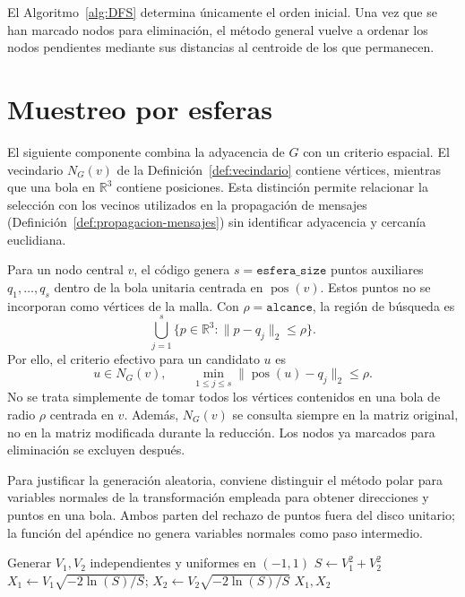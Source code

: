 El Algoritmo~\ref{alg:DFS} determina únicamente el orden inicial. Una vez que se han marcado nodos para eliminación, el método general vuelve a ordenar los nodos pendientes mediante sus distancias al centroide de los que permanecen.

\section{Muestreo por esferas}

El siguiente componente combina la adyacencia de $G$ con un criterio espacial. El vecindario $N_G(v)$ de la Definición~\ref{def:vecindario} contiene vértices, mientras que una bola en $\mathbb{R}^3$ contiene posiciones. Esta distinción permite relacionar la selección con los vecinos utilizados en la propagación de mensajes (Definición~\ref{def:propagacion-mensajes}) sin identificar adyacencia y cercanía euclidiana.

Para un nodo central $v$, el código genera $s=\texttt{esfera\_size}$ puntos auxiliares $q_1,\ldots,q_s$ dentro de la bola unitaria centrada en $\operatorname{pos}(v)$. Estos puntos no se incorporan como vértices de la malla. Con $\rho=\texttt{alcance}$, la región de búsqueda es
\[
\bigcup_{j=1}^{s}\{p\in\mathbb{R}^3:\|p-q_j\|_2\leq\rho\}.
\]
Por ello, el criterio efectivo para un candidato $u$ es
\[
u\in N_G(v),\qquad
\min_{1\leq j\leq s}\|\operatorname{pos}(u)-q_j\|_2\leq\rho.
\]
No se trata simplemente de tomar todos los vértices contenidos en una bola de radio $\rho$ centrada en $v$. Además, $N_G(v)$ se consulta siempre en la matriz original, no en la matriz modificada durante la reducción. Los nodos ya marcados para eliminación se excluyen después.

Para justificar la generación aleatoria, conviene distinguir el método polar para variables normales \cite{Knuth} de la transformación empleada para obtener direcciones y puntos en una bola. Ambos parten del rechazo de puntos fuera del disco unitario; la función del apéndice no genera variables normales como paso intermedio.

\begin{algorithm}[H]
\caption{Método polar para desviaciones normales}
\label{alg:desviaciones}
\begin{algorithmic}[1]
\Repeat
    \State Generar $V_1,V_2$ independientes y uniformes en $(-1,1)$
    \State $S\gets V_1^2+V_2^2$
\State $X_1\gets V_1\sqrt{-2\ln(S)/S}$; $X_2\gets V_2\sqrt{-2\ln(S)/S}$
\State \Return $X_1,X_2$
\end{algorithmic}
\end{algorithm}

